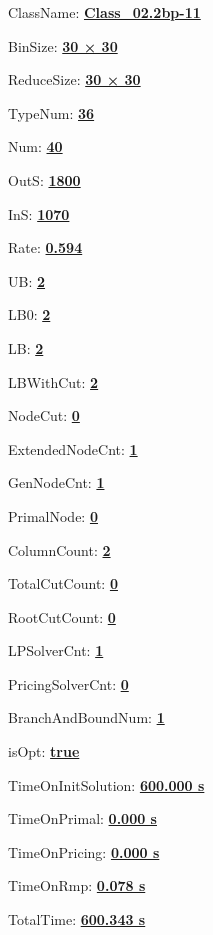 \documentclass[11pt]{article}
\begin{document}
\pagestyle{empty}


ClassName: \underline{\textbf{Class_02.2bp-11}}
\par
BinSize: \underline{\textbf{30 × 30}}
\par
ReduceSize: \underline{\textbf{30 × 30}}
\par
TypeNum: \underline{\textbf{36}}
\par
Num: \underline{\textbf{40}}
\par
OutS: \underline{\textbf{1800}}
\par
InS: \underline{\textbf{1070}}
\par
Rate: \underline{\textbf{0.594}}
\par
UB: \underline{\textbf{2}}
\par
LB0: \underline{\textbf{2}}
\par
LB: \underline{\textbf{2}}
\par
LBWithCut: \underline{\textbf{2}}
\par
NodeCut: \underline{\textbf{0}}
\par
ExtendedNodeCnt: \underline{\textbf{1}}
\par
GenNodeCnt: \underline{\textbf{1}}
\par
PrimalNode: \underline{\textbf{0}}
\par
ColumnCount: \underline{\textbf{2}}
\par
TotalCutCount: \underline{\textbf{0}}
\par
RootCutCount: \underline{\textbf{0}}
\par
LPSolverCnt: \underline{\textbf{1}}
\par
PricingSolverCnt: \underline{\textbf{0}}
\par
BranchAndBoundNum: \underline{\textbf{1}}
\par
isOpt: \underline{\textbf{true}}
\par
TimeOnInitSolution: \underline{\textbf{600.000 s}}
\par
TimeOnPrimal: \underline{\textbf{0.000 s}}
\par
TimeOnPricing: \underline{\textbf{0.000 s}}
\par
TimeOnRmp: \underline{\textbf{0.078 s}}
\par
TotalTime: \underline{\textbf{600.343 s}}
\par
\newpage
\end{document}
